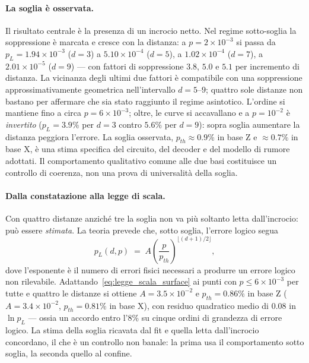 \begin{onehalfspace}
\paragraph{La soglia è osservata.}
Il risultato centrale è la presenza di un incrocio netto. Nel regime sotto-soglia la soppressione è marcata e cresce con la distanza: a $p = 2 \times 10^{-3}$ si passa da $p_L = 1.94 \times 10^{-3}$ ($d=3$) a $5.10 \times 10^{-4}$ ($d=5$), a $1.02 \times 10^{-4}$ ($d=7$), a $2.01 \times 10^{-5}$ ($d=9$) --- con fattori di soppressione $3.8$, $5.0$ e $5.1$ per incremento di distanza. La vicinanza degli ultimi due fattori è compatibile con una soppressione approssimativamente geometrica nell'intervallo $d=5$--$9$; quattro sole distanze non bastano per affermare che sia stato raggiunto il regime asintotico. L'ordine si mantiene fino a circa $p = 6 \times 10^{-3}$; oltre, le curve si accavallano e a $p = 10^{-2}$ è \emph{invertito} ($p_L = 3.9\%$ per $d=3$ contro $5.6\%$ per $d=9$): sopra soglia aumentare la distanza peggiora l'errore. La soglia osservata, $p_{th} \approx 0.9\%$ in base Z e $\approx 0.7\%$ in base X, è una stima specifica del circuito, del decoder e del modello di rumore adottati. Il comportamento qualitativo comune alle due basi costituisce un controllo di coerenza, non una prova di universalità della soglia.

\paragraph{Dalla constatazione alla legge di scala.}
Con quattro distanze anziché tre la soglia non va più soltanto letta dall'incrocio: può essere \emph{stimata}. La teoria prevede che, sotto soglia, l'errore logico segua
\begin{equation}
    p_L(d, p) \;=\; A \left(\frac{p}{p_{th}}\right)^{\lfloor (d+1)/2 \rfloor},
    \label{eq:legge_scala_surface}
\end{equation}
dove l'esponente è il numero di errori fisici necessari a produrre un errore logico non rilevabile. Adattando~\eqref{eq:legge_scala_surface} ai punti con $p \leq 6\times10^{-3}$ per tutte e quattro le distanze si ottiene $A = 3.5\times10^{-2}$ e $p_{th} = 0.86\%$ in base Z ($A = 3.4\times10^{-2}$, $p_{th} = 0.81\%$ in base X), con residuo quadratico medio di $0.08$ in $\ln p_L$ --- ossia un accordo entro l'$8\%$ su cinque ordini di grandezza di errore logico. La stima della soglia ricavata dal fit e quella letta dall'incrocio concordano, il che è un controllo non banale: la prima usa il comportamento sotto soglia, la seconda quello al confine.


\end{onehalfspace}
